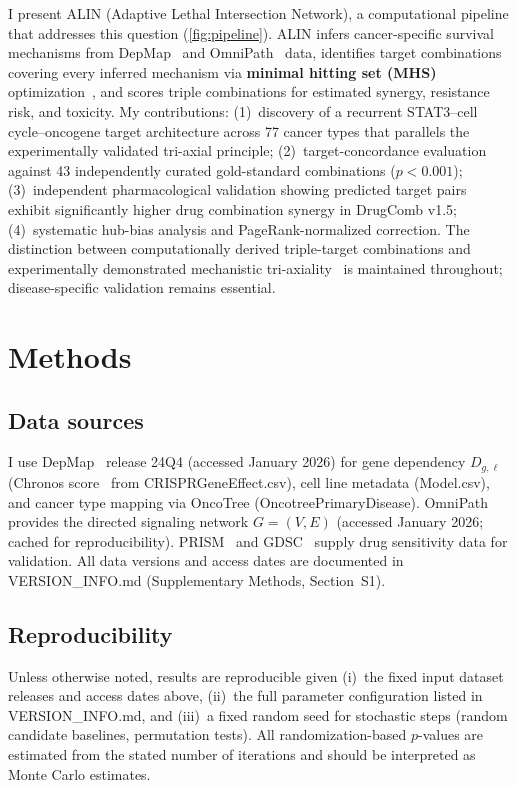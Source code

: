 \documentclass[times, twoside, watermark]{zHenriquesLab-StyleBioRxiv}
\begin{document}
I present ALIN (Adaptive Lethal Intersection Network), a computational pipeline that addresses this question (\cref{fig:pipeline}). ALIN infers cancer-specific survival mechanisms from DepMap~\cite{Dempster2021} and OmniPath~\cite{Turei2026} data, identifies target combinations covering every inferred mechanism via \textbf{minimal hitting set (MHS)} optimization~\cite{VeraLicona2013,Murakami2017}, and scores triple combinations for estimated synergy, resistance risk, and toxicity. My contributions: (1)~discovery of a recurrent STAT3--cell cycle--oncogene target architecture across 77 cancer types that parallels the experimentally validated tri-axial principle; (2)~target-concordance evaluation against 43 independently curated gold-standard combinations ($p < 0.001$); (3)~independent pharmacological validation showing predicted target pairs exhibit significantly higher drug combination synergy in DrugComb v1.5; (4)~systematic hub-bias analysis and PageRank-normalized correction. The distinction between computationally derived triple-target combinations and experimentally demonstrated mechanistic tri-axiality~\cite{Liaki2025} is maintained throughout; disease-specific validation remains essential.

\section*{Methods}

\subsection*{Data sources}
I use DepMap~\cite{Dempster2021,Tsherniak2017} release 24Q4 (accessed January 2026) for gene dependency $D_{g,\ell}$ (Chronos score~\cite{Dempster2021} from CRISPRGeneEffect.csv), cell line metadata (Model.csv), and cancer type mapping via OncoTree (OncotreePrimaryDisease). OmniPath~\cite{Turei2026} provides the directed signaling network $G = (V, E)$ (accessed January 2026; cached for reproducibility). PRISM~\cite{Corsello2020} and GDSC~\cite{Yang2013,Iorio2016} supply drug sensitivity data for validation. All data versions and access dates are documented in VERSION\_INFO.md (Supplementary Methods, Section~S1).

\subsection*{Reproducibility}
Unless otherwise noted, results are reproducible given (i)~the fixed input dataset releases and access dates above, (ii)~the full parameter configuration listed in VERSION\_INFO.md, and (iii)~a fixed random seed for stochastic steps (random candidate baselines, permutation tests). All randomization-based $p$-values are estimated from the stated number of iterations and should be interpreted as Monte Carlo estimates.
\end{document}
